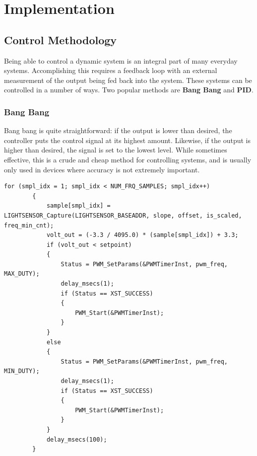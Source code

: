 \documentclass[11pt]{article}
\begin{document}
\section{Implementation}

\subsection{Control Methodology}
Being able to control a dynamic system is an integral part of many everyday systems.  Accomplishing this requires a feedback loop with an external measurement of the output being fed back into the system.  These systems can be controlled in a number of ways.  Two popular methods are \textbf{Bang Bang} and \textbf{PID}.   

\subsubsection{Bang Bang} 
Bang bang is quite straightforward: if the output is lower than desired, the controller puts the control signal at its highest amount.  Likewise, if the output is higher than desired, the signal is set to the lowest level.  While sometimes effective, this is a crude and cheap method for controlling systems, and is usually only used in devices where accuracy is not extremely important. 

\vspace{12pt}

 \begin{lstlisting}[caption=Bang Bang Algorithm, label=bang]		
 	 for (smpl_idx = 1; smpl_idx < NUM_FRQ_SAMPLES; smpl_idx++)
 	    {
 	        sample[smpl_idx] = LIGHTSENSOR_Capture(LIGHTSENSOR_BASEADDR, slope, offset, is_scaled, freq_min_cnt);
 	        volt_out = (-3.3 / 4095.0) * (sample[smpl_idx]) + 3.3; 
 	        if (volt_out < setpoint)
 	        {
 	            Status = PWM_SetParams(&PWMTimerInst, pwm_freq, MAX_DUTY);
 	            delay_msecs(1);
 	            if (Status == XST_SUCCESS)
 	            {
 	                PWM_Start(&PWMTimerInst);
 	            }
 	        }
 	        else
 	        {
 	            Status = PWM_SetParams(&PWMTimerInst, pwm_freq, MIN_DUTY);
 	            delay_msecs(1);
 	            if (Status == XST_SUCCESS)
 	            {
 	                PWM_Start(&PWMTimerInst);
 	            }
 	        }
 	        delay_msecs(100);
 	    }
  \end{lstlisting}
\end{document}

